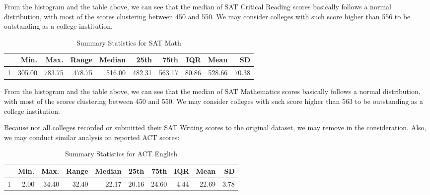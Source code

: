 \documentclass{article}\usepackage[]{graphicx}\usepackage[]{color}
\makeatletter
\newenvironment{kframe}{%
 \def\at@end@of@kframe{}%
 \ifinner\ifhmode%
  \def\at@end@of@kframe{\end{minipage}}%
  \begin{minipage}{\columnwidth}%
 \fi\fi%
 \def\FrameCommand##1{\hskip\@totalleftmargin \hskip-\fboxsep
 \colorbox{shadecolor}{##1}\hskip-\fboxsep
     \hskip-\linewidth \hskip-\@totalleftmargin \hskip\columnwidth}%
 \MakeFramed {\advance\hsize-\width
   \@totalleftmargin\z@ \linewidth\hsize
   \@setminipage}}%
 {\par\unskip\endMakeFramed%
 \at@end@of@kframe}
\makeatother
\begin{document}
From the histogram and the table above, we can see that the median of SAT Critical Reading scores basically follows a normal distribution, with most of the scores clustering between 450 and 550. We may consider colleges with such score higher than 556 to be outstanding as a college institution.

\begin{kframe}


{\ttfamily\noindent\bfseries\color{errorcolor}{\#\# Error: 'include\_graphics' is not an exported object from 'namespace:knitr'}}\end{kframe}\begin{table}[ht]
\centering
\begin{tabular}{rrrrrrrrrr}
  \hline
 & Min. & Max. & Range & Median & 25th & 75th & IQR & Mean & SD \\ 
  \hline
1 & 305.00 & 783.75 & 478.75 & 516.00 & 482.31 & 563.17 & 80.86 & 528.66 & 70.38 \\ 
   \hline
\end{tabular}
\caption{Summary Statistics for SAT Math} 
\end{table}


From the histogram and the table above, we can see that the median of SAT Mathematics scores basically follows a normal distribution, with most of the scores clustering between 450 and 550. We may consider colleges with such score higher than 563 to be outstanding as a college institution.

Because not all colleges recorded or submitted their SAT Writing scores to the original dataset, we may remove in the consideration. Also, we may conduct similar analysis on reported ACT scores:

\begin{kframe}


{\ttfamily\noindent\bfseries\color{errorcolor}{\#\# Error: 'include\_graphics' is not an exported object from 'namespace:knitr'}}\end{kframe}\begin{table}[ht]
\centering
\begin{tabular}{rrrrrrrrrr}
  \hline
 & Min. & Max. & Range & Median & 25th & 75th & IQR & Mean & SD \\ 
  \hline
1 & 2.00 & 34.40 & 32.40 & 22.17 & 20.16 & 24.60 & 4.44 & 22.69 & 3.78 \\ 
   \hline
\end{tabular}
\caption{Summary Statistics for ACT English} 
\end{table}
\end{document}
